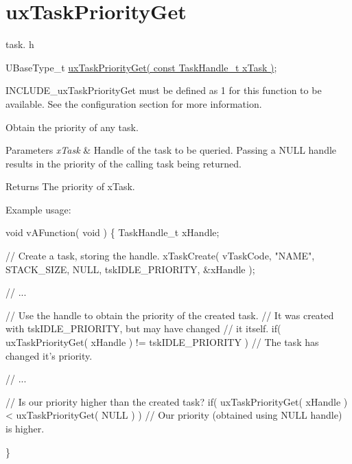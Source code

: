 \hypertarget{group__uxTaskPriorityGet}{}\section{ux\+Task\+Priority\+Get}
\label{group__uxTaskPriorityGet}
task. h 
\begin{DoxyPre}UBaseType\_t \hyperlink{task_8h_a18d1148c845f5c4bff3b9e5b2077e058}{uxTaskPriorityGet( const TaskHandle\_t xTask )};\end{DoxyPre}


I\+N\+C\+L\+U\+D\+E\+\_\+ux\+Task\+Priority\+Get must be defined as 1 for this function to be available. See the configuration section for more information.

Obtain the priority of any task.


\begin{DoxyParams}{Parameters}
{\em x\+Task} & Handle of the task to be queried. Passing a N\+U\+LL handle results in the priority of the calling task being returned.\\
\hline
\end{DoxyParams}
\begin{DoxyReturn}{Returns}
The priority of x\+Task.
\end{DoxyReturn}
Example usage\+: 
\begin{DoxyPre}
void vAFunction( void )
\{
TaskHandle\_t xHandle;
\begin{DoxyVerb}// Create a task, storing the handle.
xTaskCreate( vTaskCode, "NAME", STACK_SIZE, NULL, tskIDLE_PRIORITY, &xHandle );

// ...

// Use the handle to obtain the priority of the created task.
// It was created with tskIDLE_PRIORITY, but may have changed
// it itself.
if( uxTaskPriorityGet( xHandle ) != tskIDLE_PRIORITY )
{
 // The task has changed it's priority.
}

// ...

// Is our priority higher than the created task?
if( uxTaskPriorityGet( xHandle ) < uxTaskPriorityGet( NULL ) )
{
 // Our priority (obtained using NULL handle) is higher.
}
\end{DoxyVerb}

\}
  \end{DoxyPre}
 